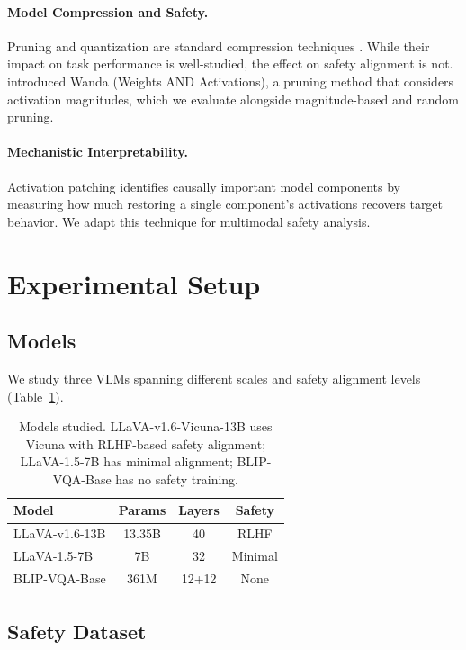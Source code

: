 \documentclass[11pt]{article}
\begin{document}
\paragraph{Model Compression and Safety.} Pruning and quantization are standard compression techniques \citep{frantar2023sparsegpt,sun2024simple}. While their impact on task performance is well-studied, the effect on safety alignment is not. \citet{sun2024simple} introduced Wanda (Weights AND Activations), a pruning method that considers activation magnitudes, which we evaluate alongside magnitude-based and random pruning.

\paragraph{Mechanistic Interpretability.} Activation patching \citep{meng2022locating,wang2023interpretability} identifies causally important model components by measuring how much restoring a single component's activations recovers target behavior. We adapt this technique for multimodal safety analysis.

\section{Experimental Setup}

\subsection{Models}

We study three VLMs spanning different scales and safety alignment levels (Table~\ref{tab:models}).

\begin{table}[t]
\centering
\small
\begin{tabular}{@{}lccc@{}}
\toprule
\textbf{Model} & \textbf{Params} & \textbf{Layers} & \textbf{Safety} \\
\midrule
LLaVA-v1.6-13B & 13.35B & 40 & RLHF \\
LLaVA-1.5-7B & 7B & 32 & Minimal \\
BLIP-VQA-Base & 361M & 12+12 & None \\
\bottomrule
\end{tabular}
\caption{Models studied. LLaVA-v1.6-Vicuna-13B uses Vicuna with RLHF-based safety alignment; LLaVA-1.5-7B has minimal alignment; BLIP-VQA-Base has no safety training.}
\label{tab:models}
\end{table}

\subsection{Safety Dataset}
\end{document}
